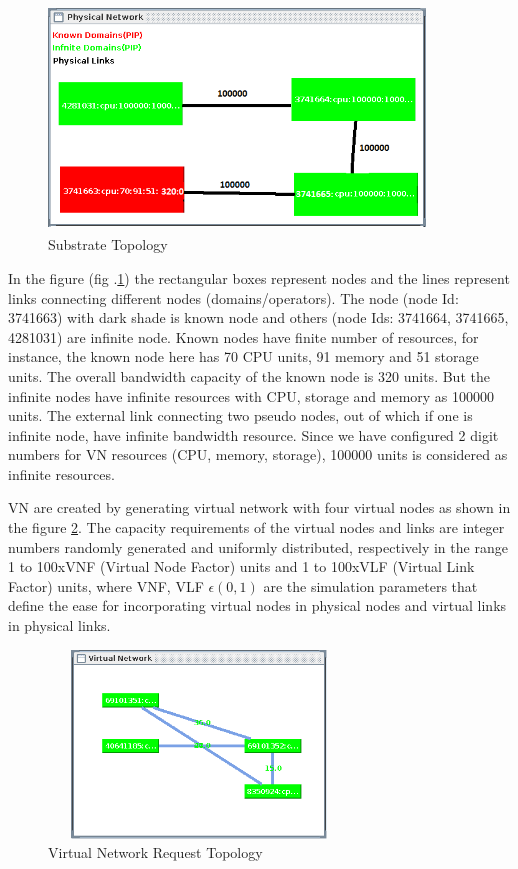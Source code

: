 \documentclass[article,dr=phil,type=msc ,colorback,accentcolor=tud4b]{tudthesis}
\begin{document}
\begin{figure}[h]
	\centering
	\includegraphics[width=10cm, height=6cm]{sub_topo.jpg}
	\caption{Substrate Topology}
	\label{sub_topo}
\end{figure}

In the figure (fig .\ref{sub_topo}) the rectangular boxes represent nodes and the lines represent links connecting different nodes (domains/operators). The node (node Id: 3741663) with dark shade is known node and others (node Ids: 3741664, 3741665, 4281031) are infinite node. Known nodes have finite number of resources, for instance, the known node here has 70 CPU units, 91 memory and 51 storage units. The overall bandwidth capacity of the known node is 320 units. But the infinite nodes have infinite resources with CPU, storage and memory as 100000 units. The external link connecting two pseudo nodes, out of which if one is infinite node, have infinite bandwidth resource. Since we have configured 2 digit numbers for VN resources (CPU, memory, storage), 100000 units is considered as infinite resources. \newline

VN are created by generating virtual network with four virtual nodes as shown in the figure \ref{virt_topo}. The capacity requirements of the virtual nodes and links are integer numbers randomly generated and uniformly distributed, respectively in the range 1 to 100xVNF (Virtual Node Factor) units and 1 to 100xVLF (Virtual Link Factor) units, where VNF, VLF $\epsilon (0, 1)$ are the simulation parameters that define the ease for incorporating virtual nodes in physical nodes and virtual links in physical links. 

\begin{figure}[h]
	\centering
	\includegraphics[width=8cm, height=5cm]{virt_topo.jpg}
	\caption{Virtual Network Request Topology}
	\label{virt_topo}
\end{figure}
\end{document}
